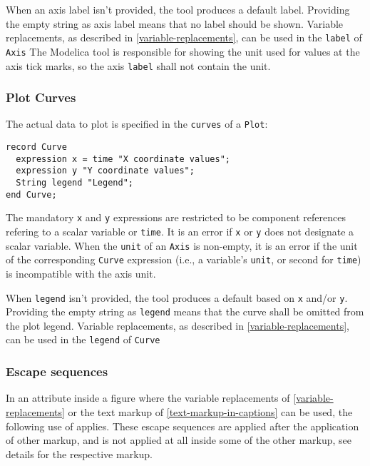 When an axis label isn't provided, the tool produces a default label.  Providing the empty string as axis label means that no label should be shown.  Variable replacements, as described in
\cref{variable-replacements}, can be used in the \lstinline!label! of \lstinline!Axis!  The Modelica tool is responsible for showing the unit used for values at the axis tick marks, so the axis
\lstinline!label! shall not contain the unit.

\subsubsection{Plot Curves}\label{plot-curves}

The actual data to plot is specified in the \lstinline!curves! of a \lstinline!Plot!:
\begin{lstlisting}[language=modelica]
record Curve
  expression x = time "X coordinate values";
  expression y "Y coordinate values";
  String legend "Legend";
end Curve;
\end{lstlisting}

The mandatory \lstinline!x! and \lstinline!y! expressions are restricted to be
component references refering to a scalar variable or \lstinline!time!. It
is an error if \lstinline!x! or \lstinline!y! does not designate a scalar variable.
When the \lstinline!unit! of an \lstinline!Axis! is non-empty, it is an error if the unit of the corresponding \lstinline!Curve! expression (i.e., a variable's \lstinline!unit!,
or second for \lstinline!time!) is incompatible with the axis unit.

When \lstinline!legend! isn't provided, the tool produces a default based on
\lstinline!x! and/or \lstinline!y!.  Providing the empty string as
\lstinline!legend! means that the curve shall be omitted from the plot legend.
Variable replacements, as described in \cref{variable-replacements}, can be
used in the \lstinline!legend! of \lstinline!Curve!

\subsubsection{Escape sequences}\label{text-markup-escape-sequences}

In an attribute inside a figure where the variable replacements of \cref{variable-replacements} or the text markup of \cref{text-markup-in-captions} can be used, the following use of  applies.
These escape sequences are applied after the application of other markup, and is not applied at all inside some of the other markup, see details for the respective markup.

